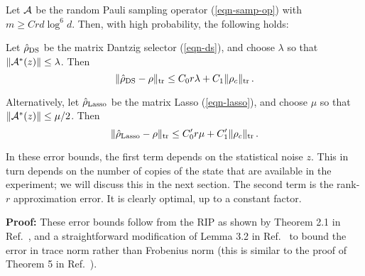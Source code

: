 \begin{theorem}
\label{thm-errorbound}
Let $\mathcal{A}$ be the random Pauli sampling operator (\ref{eqn-samp-op}) with $m \geq Crd\log^6 d$. Then, with high probability, the following holds:

Let $\hat{\rho}_{\mathrm{DS}}$ be the matrix Dantzig selector (\ref{eqn-ds}), and choose $\lambda$ so that $\lVert\mathcal{A}^*(z)\rVert \leq \lambda$.  Then 
\begin{equation*}
	\lVert\hat{\rho}_{\mathrm{DS}} - \rho\rVert_{\mathrm{tr}} \leq C_0 r\lambda + C_1 \lVert\rho_c\rVert_{\mathrm{tr}}\,.
\end{equation*}

Alternatively, let $\hat{\rho}_{\mathrm{Lasso}}$ be the matrix Lasso (\ref{eqn-lasso}), and choose $\mu$ so that $\lVert\mathcal{A}^*(z)\rVert \leq \mu/2$.  Then 
\begin{equation*}
	\lVert\hat{\rho}_{\mathrm{Lasso}} - \rho\rVert_{\mathrm{tr}} \leq C'_0 r\mu + C'_1 \lVert\rho_c\rVert_{\mathrm{tr}}\,.
\end{equation*}
\end{theorem}

In these error bounds, the first term depends on the statistical noise $z$.  This in turn depends on the number of copies of the state that are available in the experiment; we will discuss this in the next section.  The second term is the rank-$r$ approximation error.  It is clearly optimal, up to a constant factor.

\textbf{Proof:} These error bounds follow from the RIP as shown by Theorem 2.1 in Ref.~\cite{Liu2011}, and a straightforward modification of Lemma 3.2 in Ref.~\cite{Candes2011} to bound the error in trace norm rather than Frobenius norm (this is similar to the proof of Theorem 5 in Ref.~\cite{Fazel2008}).  

